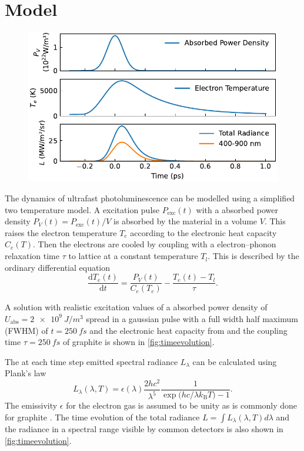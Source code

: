 \documentclass[
	a4paper,
]{scrarticle}
\begin{document}
\section{Model}
\begin{figure}[b]
    \centering
    \includegraphics{../analysis/figures/model.time_evolution.pdf}
    \caption{}
    \label{fig:timeevolution}
\end{figure}
The dynamics of ultrafast photoluminescence can be modelled using a simplified two temperature model. 
A excitation pulse $P_\text{exc}(t)$ with a absorbed power density $P_V(t) = P_\text{exc}(t) / V$ is absorbed by the material in a volume $V$.
This raises the electron temperature $T_e$ according to the electronic heat capacity $C_e(T)$. 
Then the electrons are cooled by coupling with a electron–phonon relaxation time $\tau$ to lattice at a constant temperature $T_l$.
This is described by the ordinary differential equation
\begin{equation}
    \frac{\mathrm d T_e(t)}{\mathrm d t}
    =
    \frac{P_V(t)}{C_e(T_e)}
    -\frac{T_e(t) - T_l}{\tau}.
    \label{eq:Te}
\end{equation}

A solution with realistic excitation values of a absorbed power density of $U_\text{abs} = \SI{2e9}{J/m^3}$ spread in a gaussian pulse with a full width half maximum (FWHM) of $t=\SI{250}{fs}$ and the electronic heat capacity from \cite{nihiraTemperatureDependenceLattice2003} and the coupling time $\tau=\SI{250}{fs}$ \cite{stangeHotElectronCooling2015} of graphite is shown in \autoref{fig:timeevolution}.



The at each time step emitted spectral radiance $L_\lambda$ can be calculated using Plank's law
\begin{equation}
    L_\lambda(\lambda,T)
    = \epsilon(\lambda) \frac{2hc^{2}}{\lambda^{5}}
    \frac{1}{\exp\bigl(hc / \lambda k_{\mathrm B}T\bigr)-1}.
\end{equation}
The emissivity $\epsilon$ for the electron gas is assumed to be unity as is commonly done for graphite \cite{sapritskyBlackbodyRadiometry1995}.
The time evolution of the total radiance $L=\int L_\lambda(\lambda, T) d\lambda$ and the radiance in a spectral range visible by common detectors is also shown in \autoref{fig:timeevolution}.
\end{document}
